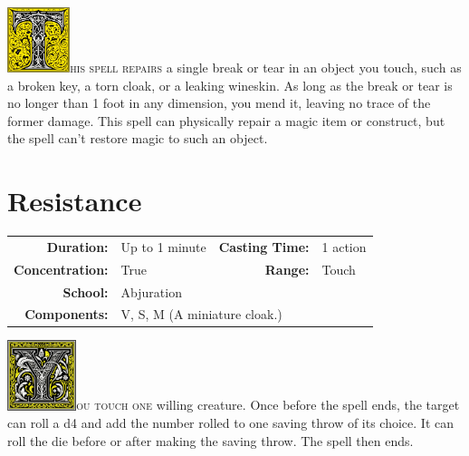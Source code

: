 \documentclass[12pt,showtrims]{memoir}
\begin{document}
\vspace{1\baselineskip}\noindent 
\lettrine[lines=4]{\includegraphics[height=54pt]{initials/T.png}}{his spell repairs } a single break or tear in an object you touch, such as a broken key, a torn cloak, or a leaking wineskin. As long as the break or tear is no longer than 1 foot in any dimension, you mend it, leaving no trace of the former damage. This spell can physically repair a magic item or construct, but the spell can't restore magic to such an object.

\newpage
\section*{Resistance}

{
\small\centering\vspace{-6pt}
\begin{tabular}{rlrl}
\toprule

\textbf{Duration:} & Up to 1 minute &
\textbf{Casting Time:} & 1 action \\
\textbf{Concentration:} & True &
\textbf{Range:} & Touch \\
\textbf{School:} & Abjuration \\
\textbf{Components:} & \multicolumn{3}{p{0.7\textwidth}}{V, S, M (A miniature cloak.)}\\

\bottomrule
\end{tabular}
}

\vspace{1\baselineskip}\noindent
\lettrine[lines=4]{\includegraphics[height=58pt]{initials/Y.png}}{ou touch one} willing creature. Once before the spell ends, the target can roll a d4 and add the number rolled to one saving throw of its choice. It can roll the die before or after making the saving throw. The spell then ends.
\end{document}
